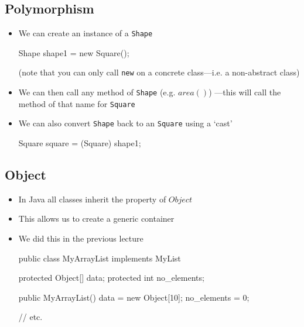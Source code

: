 
\begin{slide}
\section{Polymorphism}

\begin{PauseHighLight}
  \begin{itemize}
  \item We can create an instance of a \texttt{Shape}
    \begin{java}
      Shape shape1 = new Square();
    \end{java}
    (note that you can only call \texttt{new} on a concrete
    class---i.e. a non-abstract class)\pause
  \item We can then call any method of \texttt{Shape}
    (e.g. \jl$area()$) ---this will call
    the method of that name for \texttt{Square}\pause
  \item We can also convert \texttt{Shape} back to an \texttt{Square}
    using a `cast'
    \begin{java}
      Square square = (Square) shape1;
    \end{java}\pause
  \end{itemize}
\end{PauseHighLight}

\end{slide}



\begin{slide}
\section{Object}
\vspace{-2cm}
\begin{PauseHighLight}
  \begin{itemize}
  \item In Java all classes inherit the property of \jl$Object$\pause
  \item This allows us to create a generic container\pause
  \item We did this in the previous lecture
\begin{java}
public class MyArrayList implements MyList
{
    protected Object[] data;
    protected int no_elements;

    public MyArrayList()
    {
        data = new Object[10];
        no_elements = 0;
    }

    // etc.
}
\end{java}\pause
  \end{itemize}
\end{PauseHighLight}
\end{slide}


